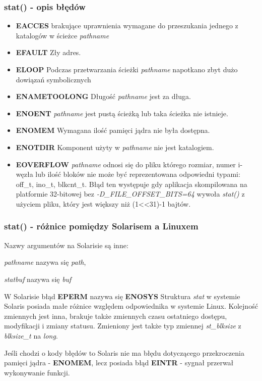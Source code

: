 \documentclass{beamer}
\begin{document}
\begin{frame}
	\frametitle{stat() - opis błędów}
\begin{itemize}
\item \textbf{EACCES} brakujące uprawnienia wymagane do przeszukania jednego z katalogów w ścieżce \textit{pathname}
\item \textbf{EFAULT} Zły adres.
\item \textbf{ELOOP} Podczas przetwarzania ścieżki \textit{pathname} napotkano zbyt dużo dowiązań symbolicznych
\item \textbf{ENAMETOOLONG} Długość \textit{pathname} jest za długa.
\item \textbf{ENOENT} \textit{pathname} jest pustą ścieżką lub taka ścieżka nie istnieje.
\item \textbf{ENOMEM}  Wymagana ilość pamięci jądra nie była dostępna.
\item \textbf{ENOTDIR}  Komponent użyty w \textit{pathname} nie jest katalogiem.
\item \textbf{EOVERFLOW} \textit{pathname} odnosi się do pliku którego rozmiar, numer i-węzła lub ilość bloków nie może być reprezentowana odpowiedni typami: off\_t, ino\_t, blkcnt\_t. Błąd ten występuje gdy aplikacja skompilowana na platformie 32-bitowej bez \textit{-D\_FILE\_OFFSET\_BITS=64} wywoła \textit{stat()} z użyciem pliku, który jest większy niż (1<<31)-1 bajtów.
\end{itemize}
\end{frame}

\begin{frame}
	\frametitle{stat() - różnice pomiędzy Solarisem a Linuxem}
Nazwy argumentów na Solarisie są inne:

\textit{pathname} nazywa się \textit{path},

\textit{statbuf} nazywa się \textit{buf}

W Solarisie  błąd \textbf{EPERM} nazywa się \textbf{ENOSYS}
Struktura \textit{stat} w systemie Solaris posiada małe różnice względem odpowiednika w systemie Linux.
Kolejność zmiennych jest inna, brakuje także zmiennych czasu ostatniego dostępu, modyfikacji i zmiany statusu.
Zmieniony jest także typ zmiennej \textit{st\_blksize} z \textit{blksize\_t} na \textit{long}.

Jeśli chodzi o kody błędów to Solaris nie ma błędu dotyczącego przekroczenia pamięci jądra - \textbf{ENOMEM}, lecz posiada błąd \textbf{EINTR} - sygnał przerwał wykonywanie funkcji.
\end{frame}
\end{document}
